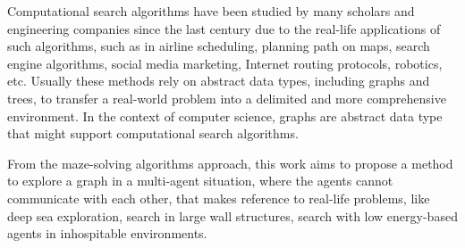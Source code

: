Computational search algorithms have been studied by many scholars and engineering companies since the last century due to the real-life applications of such algorithms, such as in airline scheduling, planning path on maps, search engine algorithms, social media marketing, Internet routing protocols, robotics, etc. Usually these methods rely on abstract data types, including graphs and trees, to transfer a real-world problem into a delimited and more comprehensive environment. In the context of computer science, graphs are abstract data type that might support computational search algorithms. 

From the maze-solving algorithms approach, this work aims to propose a method to explore a graph in a multi-agent situation, where the agents cannot communicate with each other, that makes reference to real-life problems, like deep sea exploration, search in large wall structures, search with low energy-based agents in inhospitable environments. 
